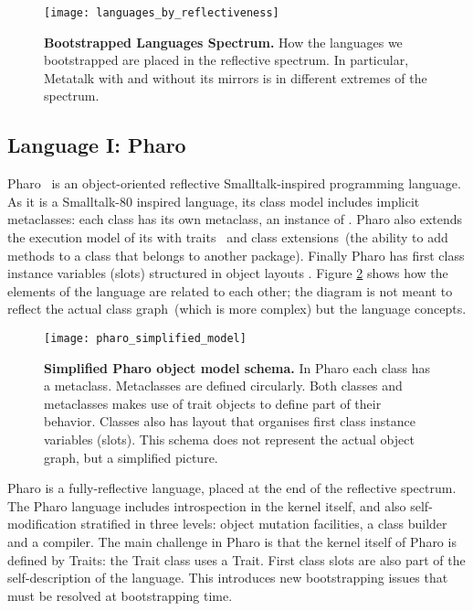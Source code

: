 \begin{figure}[ht]
\center
\texttt{[image: languages\_by\_reflectiveness]}
\caption{\textbf{Bootstrapped Languages Spectrum.} How the languages we bootstrapped are placed in the reflective spectrum. In particular, Metatalk with and without its mirrors is in different extremes of the spectrum.\label{fig:languages_spectrum}}
\end{figure}


\subsection{Language I: Pharo}\label{sec:bootstrap_pharo}

Pharo~\cite{Blac09a} is an object-oriented reflective Smalltalk-inspired programming language. As it is a Smalltalk-80 inspired language, its class model includes implicit metaclasses: each class has its own metaclass, an instance of . Pharo also extends the execution model of its \VM with traits~\cite{Scha03a} and class extensions~(\ie the ability to add methods to a class that belongs to another package). Finally Pharo has first class instance variables (slots) structured in object layouts \cite{Verw11a}. Figure \ref{fig:pharo_simplified_model} shows how the elements of the language are related to each other; the diagram is not meant to reflect the actual class graph~(which is more complex) but the language concepts.

\begin{figure}[ht]
\center
\texttt{[image: pharo\_simplified\_model]}
\caption{\textbf{Simplified Pharo object model schema.} In Pharo each class has a metaclass. Metaclasses are defined circularly. Both classes and metaclasses makes use of trait objects to define part of their behavior. Classes also has layout that organises first class instance variables (slots). This schema does not represent the actual object graph, but a simplified picture.\label{fig:pharo_simplified_model}}
\end{figure}

Pharo is a fully-reflective language, placed at the end of the reflective spectrum. The Pharo language includes introspection in the kernel itself, and also self-modification stratified in three levels: object mutation facilities, a class builder and a compiler. The main challenge in Pharo is that the kernel itself of Pharo is defined by Traits: \eg the Trait class uses a Trait. First class slots are also part of the self-description of the language. This introduces new bootstrapping issues that must be resolved at bootstrapping time.

